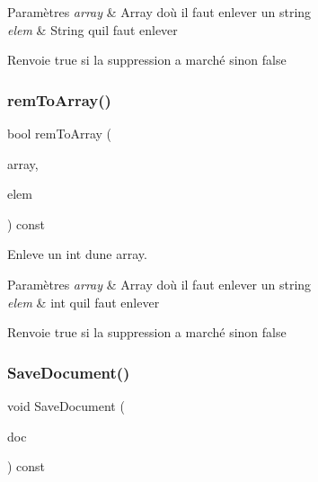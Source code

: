 \begin{DoxyParams}{Paramètres}
{\em array} & Array d\textquotesingle{}où il faut enlever un string \\
\hline
{\em elem} & String qu\textquotesingle{}il faut enlever \\
\hline
\end{DoxyParams}
\begin{DoxyReturn}{Renvoie}
true si la suppression a marché sinon false 
\end{DoxyReturn}
\mbox{\label{classDataManager_ae8c8beec1b0da3b56c08b988e7c0cf09}} 
\subsubsection{\texorpdfstring{rem\+To\+Array()}{remToArray()}\hspace{0.1cm}{\footnotesize\ttfamily [2/2]}}
{\footnotesize\ttfamily bool rem\+To\+Array (\begin{DoxyParamCaption}\item[{const Q\+String}]{array,  }\item[{const int}]{elem }\end{DoxyParamCaption}) const\hspace{0.3cm}{\ttfamily [inline]}}



Enleve un int d\textquotesingle{}une array. 


\begin{DoxyParams}{Paramètres}
{\em array} & Array d\textquotesingle{}où il faut enlever un string \\
\hline
{\em elem} & int qu\textquotesingle{}il faut enlever \\
\hline
\end{DoxyParams}
\begin{DoxyReturn}{Renvoie}
true si la suppression a marché sinon false 
\end{DoxyReturn}
\mbox{\label{classDataManager_a220fa849736606675492bf57f41241a1}} 
\subsubsection{\texorpdfstring{Save\+Document()}{SaveDocument()}}
{\footnotesize\ttfamily void Save\+Document (\begin{DoxyParamCaption}\item[{const Document $\ast$}]{doc }\end{DoxyParamCaption}) const\hspace{0.3cm}{\ttfamily [inline]}}



